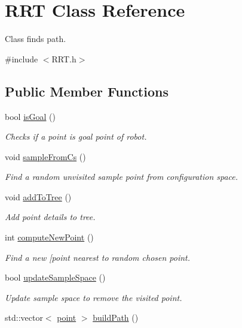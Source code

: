 \hypertarget{classRRT}{}\section{R\+RT Class Reference}
\label{classRRT}


Class finds path.  




{\ttfamily \#include $<$R\+R\+T.\+h$>$}

\subsection*{Public Member Functions}
\begin{DoxyCompactItemize}
\item 
bool \hyperlink{classRRT_a536e56c03eaf1249701915a6d349d020}{is\+Goal} ()
\begin{DoxyCompactList}\small\item\em Checks if a point is goal point of robot. \end{DoxyCompactList}\item 
void \hyperlink{classRRT_ae4efbc3892eb9dfcb642d28d5a19c7e3}{sample\+From\+Cs} ()
\begin{DoxyCompactList}\small\item\em Find a random unvisited sample point from configuration space. \end{DoxyCompactList}\item 
void \hyperlink{classRRT_ab6c1cd83695cb7dc377ca450d63a60d3}{add\+To\+Tree} ()
\begin{DoxyCompactList}\small\item\em Add point details to tree. \end{DoxyCompactList}\item 
int \hyperlink{classRRT_aa66da1beaa73a2207673f8dcd5de5289}{compute\+New\+Point} ()
\begin{DoxyCompactList}\small\item\em Find a new \mbox{[}point nearest to random chosen point. \end{DoxyCompactList}\item 
bool \hyperlink{classRRT_a632b8a8b4de79fc73b9183bacdc0d350}{update\+Sample\+Space} ()
\begin{DoxyCompactList}\small\item\em Update sample space to remove the visited point. \end{DoxyCompactList}\item 
std\+::vector$<$ \hyperlink{structpoint}{point} $>$ \hyperlink{classRRT_a520e20c364793c033b1bb899d687967c}{build\+Path} ()

\end{DoxyCompactItemize}
